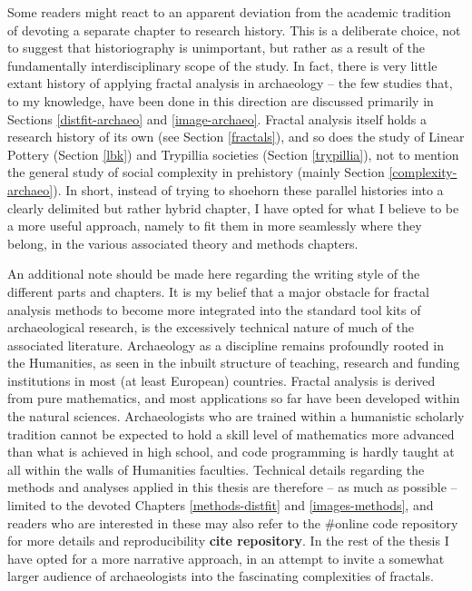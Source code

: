 \documentclass[
  12pt,
]{book}
\begin{document}
Some readers might react to an apparent deviation from the academic tradition of devoting a separate chapter to research history. This is a deliberate choice, not to suggest that historiography is unimportant, but rather as a result of the fundamentally interdisciplinary scope of the study. In fact, there is very little extant history of applying fractal analysis in archaeology -- the few studies that, to my knowledge, have been done in this direction are discussed primarily in Sections \ref{distfit-archaeo} and \ref{image-archaeo}. Fractal analysis itself holds a research history of its own (see Section \ref{fractals}), and so does the study of Linear Pottery (Section \ref{lbk}) and Trypillia societies (Section \ref{trypillia}), not to mention the general study of social complexity in prehistory (mainly Section \ref{complexity-archaeo}). In short, instead of trying to shoehorn these parallel histories into a clearly delimited but rather hybrid chapter, I have opted for what I believe to be a more useful approach, namely to fit them in more seamlessly where they belong, in the various associated theory and methods chapters.

An additional note should be made here regarding the writing style of the different parts and chapters. It is my belief that a major obstacle for fractal analysis methods to become more integrated into the standard tool kits of archaeological research, is the excessively technical nature of much of the associated literature. Archaeology as a discipline remains profoundly rooted in the Humanities, as seen in the inbuilt structure of teaching, research and funding institutions in most (at least European) countries. Fractal analysis is derived from pure mathematics, and most applications so far have been developed within the natural sciences. Archaeologists who are trained within a humanistic scholarly tradition cannot be expected to hold a skill level of mathematics more advanced than what is achieved in high school, and code programming is hardly taught at all within the walls of Humanities faculties. Technical details regarding the methods and analyses applied in this thesis are therefore -- as much as possible -- limited to the devoted Chapters \ref{methods-distfit} and \ref{images-methods}, and readers who are interested in these may also refer to the \#online code repository for more details and reproducibility \textbf{cite repository}. In the rest of the thesis I have opted for a more narrative approach, in an attempt to invite a somewhat larger audience of archaeologists into the fascinating complexities of fractals.
\end{document}
